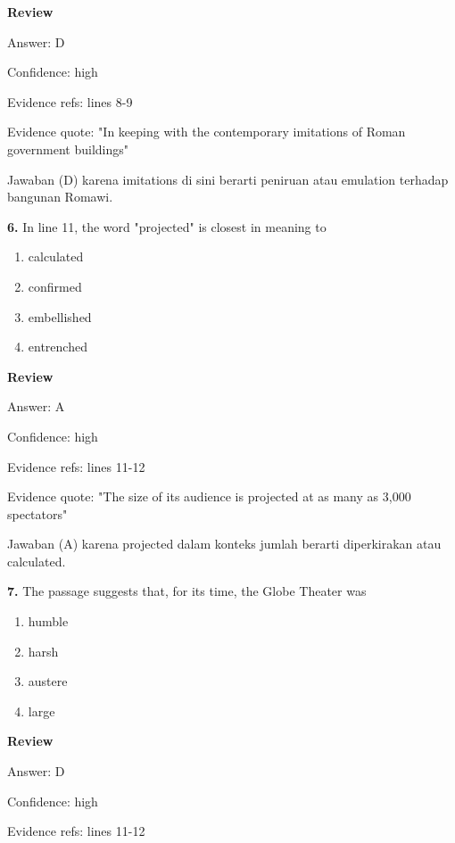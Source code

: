 \documentclass[12pt]{article}
\begin{document}
\textbf{Review}\par
Answer: D\par
Confidence: high\par
Evidence refs: lines 8-9\par
Evidence quote: "In keeping with the contemporary imitations of Roman government buildings"\par
Jawaban (D) karena imitations di sini berarti peniruan atau emulation terhadap bangunan Romawi.\par
\endgroup
\par
\vspace{0.25\baselineskip}
\noindent\textbf{6.} In line 11, the word "projected" is closest in meaning to
\begin{enumerate}[label=(\Alph*),leftmargin=*,itemsep=0.2em]
\item calculated
\item confirmed
\item embellished
\item entrenched
\end{enumerate}
\par
\begingroup
\setlength{\parskip}{0pt}
\setlength{\parindent}{0pt}
\textbf{Review}\par
Answer: A\par
Confidence: high\par
Evidence refs: lines 11-12\par
Evidence quote: "The size of its audience is projected at as many as 3,000 spectators"\par
Jawaban (A) karena projected dalam konteks jumlah berarti diperkirakan atau calculated.\par
\endgroup
\par
\vspace{0.25\baselineskip}
\noindent\textbf{7.} The passage suggests that, for its time, the Globe Theater was
\begin{enumerate}[label=(\Alph*),leftmargin=*,itemsep=0.2em]
\item humble
\item harsh
\item austere
\item large
\end{enumerate}
\par
\begingroup
\setlength{\parskip}{0pt}
\setlength{\parindent}{0pt}
\textbf{Review}\par
Answer: D\par
Confidence: high\par
Evidence refs: lines 11-12\par
\end{document}
